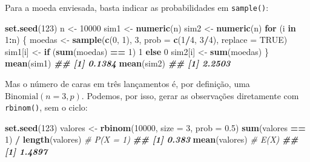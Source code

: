 \documentclass[
  portuguese,
  11pt,
  openany]{book}
\newenvironment{Shaded}{\begin{snugshade}}{\end{snugshade}}
\newcommand{\AttributeTok}[1]{\textcolor[rgb]{0.13,0.29,0.53}{#1}}
\newcommand{\CommentTok}[1]{\textcolor[rgb]{0.56,0.35,0.01}{\textit{#1}}}
\newcommand{\ConstantTok}[1]{\textcolor[rgb]{0.56,0.35,0.01}{#1}}
\newcommand{\ControlFlowTok}[1]{\textcolor[rgb]{0.13,0.29,0.53}{\textbf{#1}}}
\newcommand{\DecValTok}[1]{\textcolor[rgb]{0.00,0.00,0.81}{#1}}
\newcommand{\DocumentationTok}[1]{\textcolor[rgb]{0.56,0.35,0.01}{\textbf{\textit{#1}}}}
\newcommand{\FloatTok}[1]{\textcolor[rgb]{0.00,0.00,0.81}{#1}}
\newcommand{\FunctionTok}[1]{\textcolor[rgb]{0.13,0.29,0.53}{\textbf{#1}}}
\newcommand{\NormalTok}[1]{#1}
\newcommand{\OtherTok}[1]{\textcolor[rgb]{0.56,0.35,0.01}{#1}}
\newcommand{\SpecialCharTok}[1]{\textcolor[rgb]{0.81,0.36,0.00}{\textbf{#1}}}
\begin{document}
Para a moeda enviesada, basta indicar as probabilidades em \texttt{sample()}:

\begin{Shaded}
\begin{Highlighting}[]
\FunctionTok{set.seed}\NormalTok{(}\DecValTok{123}\NormalTok{)}
\NormalTok{n }\OtherTok{\textless{}{-}} \DecValTok{10000}
\NormalTok{sim1 }\OtherTok{\textless{}{-}} \FunctionTok{numeric}\NormalTok{(n)}
\NormalTok{sim2 }\OtherTok{\textless{}{-}} \FunctionTok{numeric}\NormalTok{(n)}
\ControlFlowTok{for}\NormalTok{ (i }\ControlFlowTok{in} \DecValTok{1}\SpecialCharTok{:}\NormalTok{n) \{}
\NormalTok{  moedas }\OtherTok{\textless{}{-}} \FunctionTok{sample}\NormalTok{(}\FunctionTok{c}\NormalTok{(}\DecValTok{0}\NormalTok{, }\DecValTok{1}\NormalTok{), }\DecValTok{3}\NormalTok{, }\AttributeTok{prob =} \FunctionTok{c}\NormalTok{(}\DecValTok{1}\SpecialCharTok{/}\DecValTok{4}\NormalTok{, }\DecValTok{3}\SpecialCharTok{/}\DecValTok{4}\NormalTok{), }\AttributeTok{replace =} \ConstantTok{TRUE}\NormalTok{)}
\NormalTok{  sim1[i] }\OtherTok{\textless{}{-}} \ControlFlowTok{if}\NormalTok{ (}\FunctionTok{sum}\NormalTok{(moedas) }\SpecialCharTok{==} \DecValTok{1}\NormalTok{) }\DecValTok{1} \ControlFlowTok{else} \DecValTok{0}
\NormalTok{  sim2[i] }\OtherTok{\textless{}{-}} \FunctionTok{sum}\NormalTok{(moedas)}
\NormalTok{\}}
\FunctionTok{mean}\NormalTok{(sim1)}
\DocumentationTok{\#\# [1] 0.1384}
\FunctionTok{mean}\NormalTok{(sim2)}
\DocumentationTok{\#\# [1] 2.2503}
\end{Highlighting}
\end{Shaded}

Mas o número de caras em três lançamentos é, por definição, uma
\(\text{Binomial}(n = 3, p)\). Podemos, por isso, gerar as observações diretamente com
\texttt{rbinom()}, sem o ciclo:

\begin{Shaded}
\begin{Highlighting}[]
\FunctionTok{set.seed}\NormalTok{(}\DecValTok{123}\NormalTok{)}
\NormalTok{valores }\OtherTok{\textless{}{-}} \FunctionTok{rbinom}\NormalTok{(}\DecValTok{10000}\NormalTok{, }\AttributeTok{size =} \DecValTok{3}\NormalTok{, }\AttributeTok{prob =} \FloatTok{0.5}\NormalTok{)}
\FunctionTok{sum}\NormalTok{(valores }\SpecialCharTok{==} \DecValTok{1}\NormalTok{) }\SpecialCharTok{/} \FunctionTok{length}\NormalTok{(valores)   }\CommentTok{\# P(X = 1)}
\DocumentationTok{\#\# [1] 0.383}
\FunctionTok{mean}\NormalTok{(valores)                         }\CommentTok{\# E(X)}
\DocumentationTok{\#\# [1] 1.4897}
\end{Highlighting}
\end{Shaded}
\end{document}
